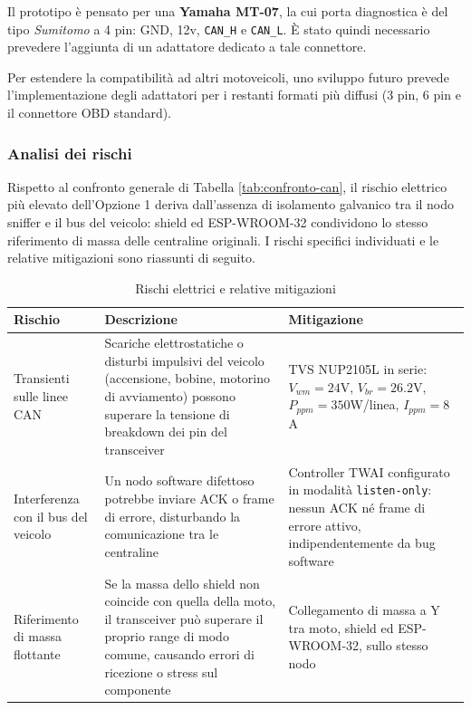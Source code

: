 Il prototipo è pensato per una \textbf{Yamaha MT-07}, la cui porta diagnostica è del tipo \textit{Sumitomo} a 4 pin: GND, 12v, \texttt{CAN\_H} e \texttt{CAN\_L}.
È stato quindi necessario prevedere l'aggiunta di un adattatore dedicato a tale connettore. 

Per estendere la compatibilità ad altri motoveicoli, uno sviluppo futuro prevede l'implementazione degli 
adattatori per i restanti formati più diffusi (3 pin, 6 pin e il connettore OBD standard).

\subsubsection{Analisi dei rischi}

Rispetto al confronto generale di Tabella \ref{tab:confronto-can}, il rischio elettrico più elevato dell'Opzione 1 deriva dall'assenza di
isolamento galvanico tra il nodo sniffer e il bus del veicolo: shield ed ESP-WROOM-32 condividono lo stesso riferimento di massa delle centraline
originali. I rischi specifici individuati e le relative mitigazioni sono riassunti di seguito. 

\begin{table}[H]
    \centering
    \begin{tabular}{p{4cm} p{6cm} p{4cm}}
        \hline
        \textbf{Rischio} & \textbf{Descrizione} & \textbf{Mitigazione} \\
        \hline
        Transienti sulle linee CAN & Scariche elettrostatiche o disturbi impulsivi del veicolo (accensione, bobine, motorino di
        avviamento) possono superare la tensione di breakdown dei pin del transceiver & TVS NUP2105L in serie: $V_{wm}=24$V,
        $V_{br}=26.2$V, $P_{ppm}=350$W/linea, $I_{ppm}=8$A \\
        \hline
        Interferenza con il bus del veicolo & Un nodo software difettoso potrebbe inviare ACK o frame di errore, disturbando la
        comunicazione tra le centraline & Controller TWAI configurato in modalità \texttt{listen-only}: nessun ACK né frame di
        errore attivo, indipendentemente da bug software \\
        \hline
        Riferimento di massa flottante & Se la massa dello shield non coincide con quella della moto, il transceiver può superare il
        proprio range di modo comune, causando errori di ricezione o stress sul componente & Collegamento di massa a Y tra moto,
        shield ed ESP-WROOM-32, sullo stesso nodo \\
        \hline
    \end{tabular}
    \caption{Rischi elettrici e relative mitigazioni}
\end{table}


